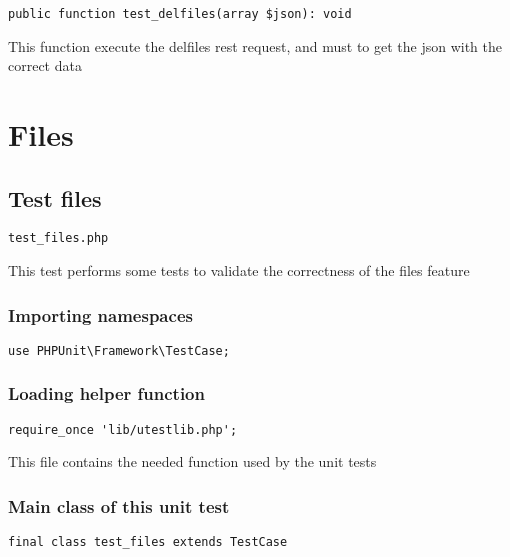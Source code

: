 \documentclass[a4paper]{article}
\begin{document}
\begin{lstlisting}
public function test_delfiles(array $json): void
\end{lstlisting}

This function execute the delfiles rest request, and must to get the
json with the correct data


\hypertarget{toc195}{}
\section{Files}

\hypertarget{toc196}{}
\subsection{Test files}

\begin{lstlisting}
test_files.php
\end{lstlisting}

This test performs some tests to validate the correctness
of the files feature

\hypertarget{toc197}{}
\subsubsection{Importing namespaces}

\begin{lstlisting}
use PHPUnit\Framework\TestCase;
\end{lstlisting}

\hypertarget{toc198}{}
\subsubsection{Loading helper function}

\begin{lstlisting}
require_once 'lib/utestlib.php';
\end{lstlisting}

This file contains the needed function used by the unit tests

\hypertarget{toc199}{}
\subsubsection{Main class of this unit test}

\begin{lstlisting}
final class test_files extends TestCase
\end{lstlisting}

\hypertarget{toc200}{}
\end{document}

